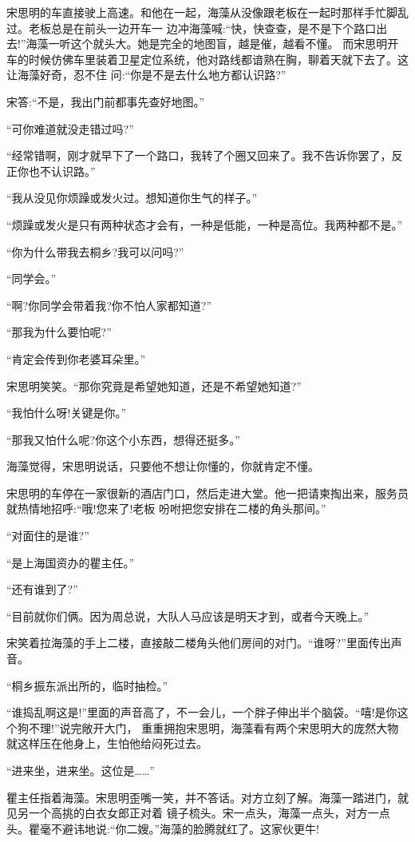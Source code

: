 \documentclass[11pt,a4paper,onecolumn]{article}
\begin{document}
宋思明的车直接驶上高速。和他在一起，海藻从没像跟老板在一起时那样手忙脚乱过。老板总是在前头一边开车一
边冲海藻喊:``快，快查查，是不是下个路口出去!''海藻一听这个就头大。她是完全的地图盲，越是催，越看不懂。
而宋思明开车的时候仿佛车里装着卫星定位系统，他对路线都谙熟在胸，聊着天就下去了。这让海藻好奇，忍不住
问:``你是不是去什么地方都认识路?''

宋答:``不是，我出门前都事先查好地图。''

``可你难道就没走错过吗?''

``经常错啊，刚才就早下了一个路口，我转了个圈又回来了。我不告诉你罢了，反正你也不认识路。''

``我从没见你烦躁或发火过。想知道你生气的样子。''

``烦躁或发火是只有两种状态才会有，一种是低能，一种是高位。我两种都不是。''

``你为什么带我去桐乡?我可以问吗?''

``同学会。''

``啊?你同学会带着我?你不怕人家都知道?''

``那我为什么要怕呢?''

``肯定会传到你老婆耳朵里。''

宋思明笑笑。``那你究竟是希望她知道，还是不希望她知道?''

``我怕什么呀!关键是你。''

``那我又怕什么呢?你这个小东西，想得还挺多。''

海藻觉得，宋思明说话，只要他不想让你懂的，你就肯定不懂。

宋思明的车停在一家很新的酒店门口，然后走进大堂。他一把请柬掏出来，服务员就热情地招呼:``哦!您来了!老板
吩咐把您安排在二楼的角头那间。''

``对面住的是谁?''

``是上海国资办的瞿主任。''

``还有谁到了?''

``目前就你们俩。因为周总说，大队人马应该是明天才到，或者今天晚上。''

宋笑着拉海藻的手上二楼，直接敲二楼角头他们房间的对门。``谁呀?''里面传出声音。

``桐乡振东派出所的，临时抽检。''

``谁捣乱啊这是!''里面的声音高了，不一会儿，一个胖子伸出半个脑袋。``嘻!是你这个狗不理!''说完敞开大门，
重重拥抱宋思明，海藻看有两个宋思明大的庞然大物就这样压在他身上，生怕他给闷死过去。

``进来坐，进来坐。这位是……''

瞿主任指着海藻。宋思明歪嘴一笑，并不答话。对方立刻了解。海藻一踏进门，就见另一个高挑的白衣女郎正对着
镜子梳头。宋一点头，海藻一点头，对方一点头。瞿毫不避讳地说:``你二嫂。''海藻的脸腾就红了。这家伙更牛!
\end{document}
